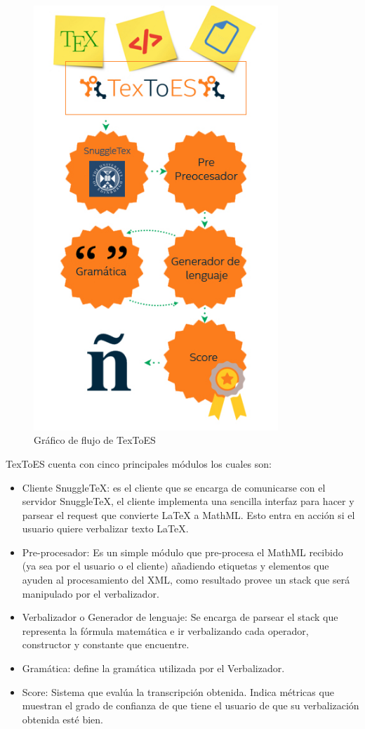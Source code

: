 \begin{figure}[H]
\centering
	\includegraphics[width=9.22cm, height=16cm]{Figures/detalle-arqui}
	\caption[]{Gráfico de flujo de TexToES}
\label{fig:arquitectura}
\end{figure}

TexToES cuenta con cinco principales módulos los cuales son:

\begin{itemize}
\item Cliente SnuggleTeX: es el cliente que se encarga de comunicarse con el servidor SnuggleTeX, el cliente implementa una sencilla interfaz para hacer y parsear el request que convierte LaTeX a MathML. Esto entra en acción si el usuario quiere verbalizar texto LaTeX.
\item Pre-procesador: Es un simple módulo que pre-procesa el MathML recibido (ya sea por el usuario o el cliente) añadiendo etiquetas y elementos que ayuden al procesamiento del XML, como resultado provee un stack que será manipulado por el verbalizador.
\item Verbalizador o Generador de lenguaje: Se encarga de parsear el stack que representa la fórmula matemática e ir verbalizando cada operador, constructor y constante que encuentre.
\item Gramática: define la gramática utilizada por el Verbalizador.
\item Score: Sistema que evalúa la transcripción obtenida. Indica métricas que muestran el grado de confianza de que tiene el usuario de que su verbalización obtenida esté bien.
\end{itemize}

